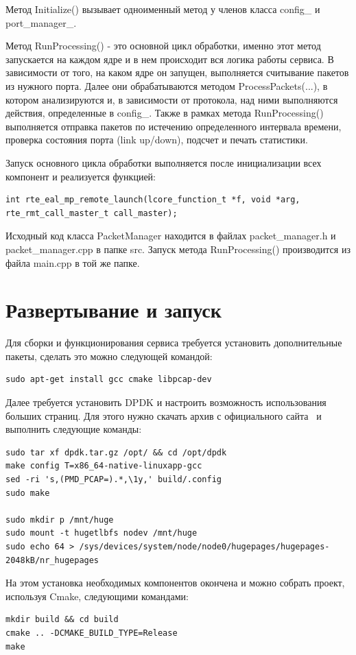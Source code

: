 Метод Initialize() вызывает одноименный метод у членов класса config\_ и port\_manager\_.

Метод RunProcessing() - это основной цикл обработки, именно этот метод  запускается на каждом ядре и в нем происходит вся логика работы сервиса. В зависимости от того, на каком ядре он запущен, выполняется считывание пакетов из нужного порта. Далее они обрабатываются методом ProcessPackets(...), в котором анализируются и, в зависимости от протокола, над ними выполняются действия, определенные в config\_. Также в рамках метода RunProcessing() выполняется отправка пакетов по истечению определенного интервала времени, проверка состояния порта (link up/down), подсчет и печать статистики.

Запуск основного цикла обработки выполняется после инициализации всех компонент и реализуется функцией:
\begin{lstlisting}
int rte_eal_mp_remote_launch(lcore_function_t *f, void *arg, rte_rmt_call_master_t call_master);
\end{lstlisting}

Исходный код класса PacketManager находится в файлах packet\_manager.h и packet\_manager.cpp в папке src. Запуск метода RunProcessing() производится из файла main.cpp в той же папке.

\section{Развертывание и запуск}
Для сборки и функционирования сервиса требуется установить дополнительные пакеты, сделать это можно следующей командой:
\begin{lstlisting}
sudo apt-get install gcc cmake libpcap-dev
\end{lstlisting}

Далее требуется установить DPDK и настроить возможность использования больших страниц. Для этого нужно скачать архив с официального сайта~\cite{dpdk_descr} и выполнить следующие команды:
\begin{lstlisting}
sudo tar xf dpdk.tar.gz /opt/ && cd /opt/dpdk
make config T=x86_64-native-linuxapp-gcc
sed -ri 's,(PMD_PCAP=).*,\1y,' build/.config
sudo make

sudo mkdir p /mnt/huge
sudo mount -t hugetlbfs nodev /mnt/huge
sudo echo 64 > /sys/devices/system/node/node0/hugepages/hugepages-2048kB/nr_hugepages
\end{lstlisting}

На этом установка необходимых компонентов окончена и можно собрать проект, используя Cmake, следующими командами:
\begin{lstlisting}
mkdir build && cd build
cmake .. -DCMAKE_BUILD_TYPE=Release
make
\end{lstlisting}

